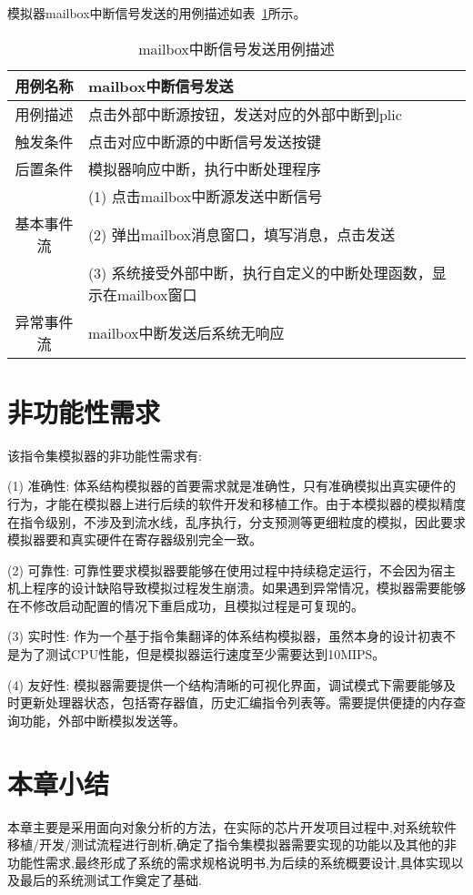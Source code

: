 模拟器mailbox中断信号发送的用例描述如表~\ref{tab:yongli5}所示。
\begin{table}[H]
  \centering
  \caption{mailbox中断信号发送用例描述}
  \label{tab:yongli5}
  \renewcommand\arraystretch{1.1}
  \begin{tabular}{cl}
    \toprule
用例名称 & mailbox中断信号发送\\
    \midrule
用例描述	& 点击外部中断源按钮，发送对应的外部中断到plic\\ \hline
触发条件	& 点击对应中断源的中断信号发送按键\\ \hline
后置条件	& 模拟器响应中断，执行中断处理程序\\ \hline
 &	(1)	点击mailbox中断源发送中断信号\\
 基本事件流 & (2)	弹出mailbox消息窗口，填写消息，点击发送\\
 & (3)	系统接受外部中断，执行自定义的中断处理函数，显示在mailbox窗口\\ \hline
异常事件流 &	mailbox中断发送后系统无响应\\
    \bottomrule
  \end{tabular}
\end{table}


\section{非功能性需求}

该指令集模拟器的非功能性需求有:


(1) 准确性: 体系结构模拟器的首要需求就是准确性，只有准确模拟出真实硬件的行为，才能在模拟器上进行后续的软件开发和移植工作。由于本模拟器的模拟精度在指令级别，不涉及到流水线，乱序执行，分支预测等更细粒度的模拟，因此要求模拟器要和真实硬件在寄存器级别完全一致。


(2) 可靠性: 可靠性要求模拟器要能够在使用过程中持续稳定运行，不会因为宿主机上程序的设计缺陷导致模拟过程发生崩溃。如果遇到异常情况，模拟器需要能够在不修改启动配置的情况下重启成功，且模拟过程是可复现的。


(3) 实时性: 作为一个基于指令集翻译的体系结构模拟器，虽然本身的设计初衷不是为了测试CPU性能，但是模拟器运行速度至少需要达到10MIPS。


(4) 友好性: 模拟器需要提供一个结构清晰的可视化界面，调试模式下需要能够及时更新处理器状态，包括寄存器值，历史汇编指令列表等。需要提供便捷的内存查询功能，外部中断模拟发送等。




\section{本章小结}

本章主要是采用面向对象分析的方法，在实际的芯片开发项目过程中,对系统软件移植/开发/测试流程进行剖析,确定了指令集模拟器需要实现的功能以及其他的非功能性需求,最终形成了系统的需求规格说明书,为后续的系统概要设计,具体实现以及最后的系统测试工作奠定了基础.


